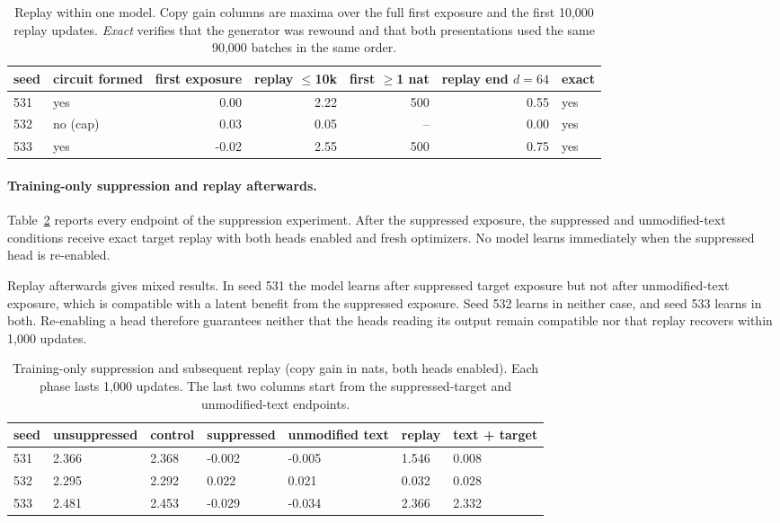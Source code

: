 \begin{table}[!htbp]
\centering\small
\caption{Replay within one model. Copy gain columns are maxima over the full
first exposure and the first 10,000 replay updates. \emph{Exact} verifies that the
generator was rewound and that both presentations used the same 90,000 batches in
the same order.}
\label{tab:replay}
\begin{tabular}{llrrrrl}\toprule
seed & circuit formed & first exposure & replay $\le$10k & first $\ge$1 nat & replay end $d{=}64$ & exact\\\midrule
531 & yes & 0.00 & 2.22 & 500 & 0.55 & yes \\
532 & no (cap) & 0.03 & 0.05 & -- & 0.00 & yes \\
533 & yes & -0.02 & 2.55 & 500 & 0.75 & yes \\
\bottomrule\end{tabular}
\end{table}

\paragraph{Training-only suppression and replay afterwards.}
Table~\ref{tab:stable} reports every endpoint of the suppression experiment. After
the suppressed exposure, the suppressed and unmodified-text conditions receive
exact target replay with both heads enabled and fresh optimizers. No model learns
immediately when the suppressed head is re-enabled.

Replay afterwards gives mixed results. In seed 531 the model learns after
suppressed target exposure but not after unmodified-text exposure, which is
compatible with a latent benefit from the suppressed exposure. Seed 532 learns in
neither case, and seed 533 learns in both. Re-enabling a head therefore guarantees
neither that the heads reading its output remain compatible nor that replay
recovers within 1,000 updates.

\begin{table}[htbp]\centering\small
\caption{Training-only suppression and subsequent replay (copy gain in nats, both
heads enabled). Each phase lasts 1,000 updates. The last two columns start from the
suppressed-target and unmodified-text endpoints.}\label{tab:stable}
\begin{tabular}{lllllll}\toprule
seed & unsuppressed & control & suppressed & unmodified text & replay & text + target \\
\midrule
531 & 2.366 & 2.368 & -0.002 & -0.005 & 1.546 & 0.008 \\
532 & 2.295 & 2.292 & 0.022 & 0.021 & 0.032 & 0.028 \\
533 & 2.481 & 2.453 & -0.029 & -0.034 & 2.366 & 2.332 \\
\bottomrule\end{tabular}
\end{table}

